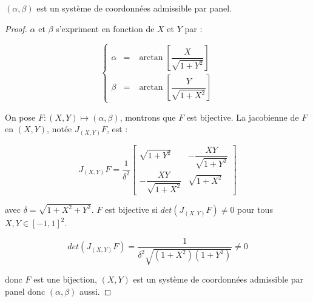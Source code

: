 \begin{theoreme}
$(\alpha, \beta)$ est un système de coordonnées admissible par panel.
\end{theoreme}

\begin{proof}

$\alpha$ et $\beta$ s'expriment en fonction de $X$ et $Y$ par :

\begin{equation}
\left\lbrace
\begin{array}{rcl}
\alpha & = & \arctan \left[ \dfrac{X}{\sqrt{1+ Y^2}} \right] \\
\beta & = & \arctan \left[ \dfrac{Y}{\sqrt{1+X^2}} \right] 
\end{array}
\right.
\label{eq: alpha et beta fct de X et Y}
\end{equation}

On pose $F : (X,Y) \mapsto (\alpha,  \beta)$, montrons que $F$ est bijective. La jacobienne de $F$ en $(X,Y)$, notée $J_{(X,Y)}F$, est :

\begin{equation}
J_{(X,Y)}F = \dfrac{1}{\delta^2} 
\begin{bmatrix}
\sqrt{1+Y^2} & - \dfrac{XY}{\sqrt{1+Y^2}} \\
- \dfrac{XY}{\sqrt{1+X^2}} & \sqrt{1+X^2}
\end{bmatrix}
\end{equation}

avec $\delta = \sqrt{1+X^2+Y^2}$. $F$ est bijective si $det \left( J_{(X,Y)}F \right) \neq 0$ pour tous $X,Y \in [-1,1]^2$.

\begin{equation}
det \left( J_{(X,Y)}F \right) = \dfrac{1}{\delta^2 \sqrt{(1+X^2)(1+Y^2)}} \neq 0
\end{equation}

donc $F$ est une bijection, $(X,Y)$ est un système de coordonnées admissible par panel donc $(\alpha, \beta)$ aussi.

\end{proof}























